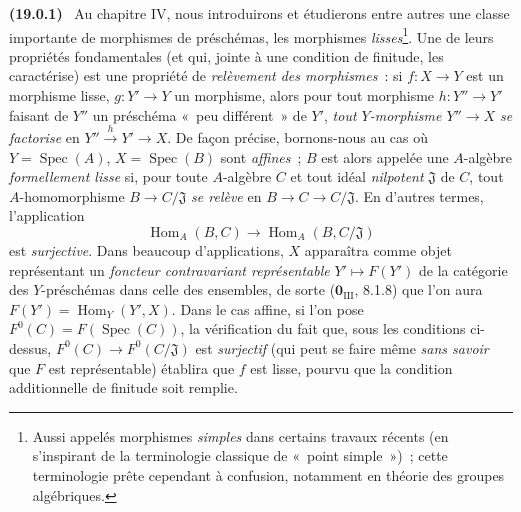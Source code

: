 \documentclass[10pt,oneside]{book}
\makeatletter
\newcommand{\setmanualcurrentlabel}[1]{\def\@currentlabel{#1}}
\newenvironment{env}[1][]{\setmanualcurrentlabel{#1}\par\medskip\noindent\textbf{(#1)}\ }{\par}
\makeatother
\begin{document}
\begin{env}[19.0.1]
\label{0.19.0.1-fr}
Au chapitre IV, nous introduirons et étudierons entre autres une classe
importante de morphismes de préschémas, les morphismes \emph{lisses}\footnote{Aussi
appelés morphismes \emph{simples} dans certains travaux récents (en s'inspirant
de la terminologie classique de «~point simple~»)~; cette terminologie prête
cependant à confusion, notamment en théorie des groupes algébriques.}. Une de
leurs propriétés fondamentales (et qui, jointe à une condition de finitude, les
caractérise) est une propriété de \emph{relèvement des morphismes}~: si
$f:X\to Y$ est un morphisme lisse, $g:Y'\to Y$ un morphisme, alors pour tout
morphisme $h:Y''\to Y'$ faisant de $Y''$ un préschéma «~peu différent~» de
$Y'$, \emph{tout $Y$-morphisme $Y''\to X$ se factorise} en
$Y''\xrightarrow{h}Y'\to X$. De façon précise, bornons-nous au cas où
$Y=\operatorname{Spec}(A)$, $X=\operatorname{Spec}(B)$ sont \emph{affines}~;
$B$ est alors appelée une $A$-algèbre \emph{formellement lisse} si, pour toute
$A$-algèbre $C$ et tout idéal \emph{nilpotent} $\mathfrak J$ de $C$, tout
$A$-homomorphisme $B\to C/\mathfrak J$ \emph{se relève} en
$B\to C\to C/\mathfrak J$. En d'autres termes, l'application
\[
  \operatorname{Hom}_A(B,C)\longrightarrow
  \operatorname{Hom}_A(B,C/\mathfrak J)
\]
est \emph{surjective}. Dans beaucoup d'applications, $X$ apparaîtra comme objet
représentant un \emph{foncteur contravariant représentable} $Y'\mapsto F(Y')$
de la catégorie des $Y$-préschémas dans celle des ensembles, de sorte
($\mathbf{0}_{\mathrm{III}}$, 8.1.8) que l'on aura
$F(Y')=\operatorname{Hom}_Y(Y',X)$. Dans le cas affine, si l'on pose
$F^0(C)=F(\operatorname{Spec}(C))$, la vérification du fait que, sous les
conditions ci-dessus, $F^0(C)\to F^0(C/\mathfrak J)$ est \emph{surjectif}
(qui peut se faire même \emph{sans savoir} que $F$ est représentable) établira
que $f$ est lisse, pourvu que la condition additionnelle de finitude soit
remplie.
\end{env}
\end{document}
